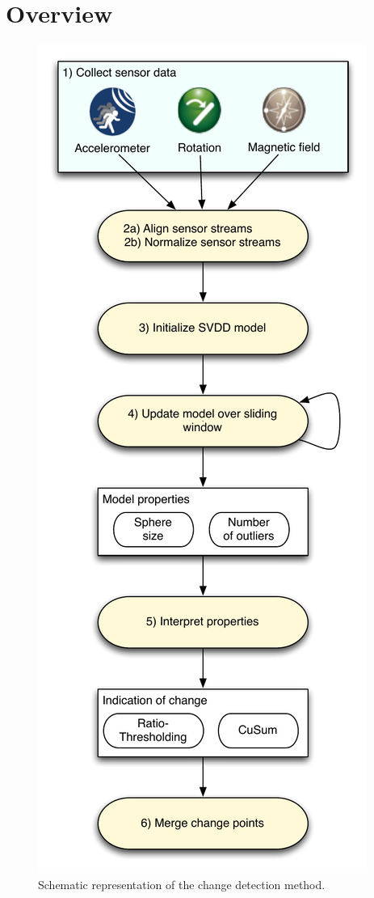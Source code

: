 \section{Overview}\label{sec:method_overview}

\begin{figure}
  \centering
    \includegraphics[width=\textwidth,height=\textheight,keepaspectratio]{./Figures/chapter4/method_setup.pdf}
  \caption[Method setup]{Schematic representation of the change detection method.}
  \label{fig:method_overview}
\end{figure}

